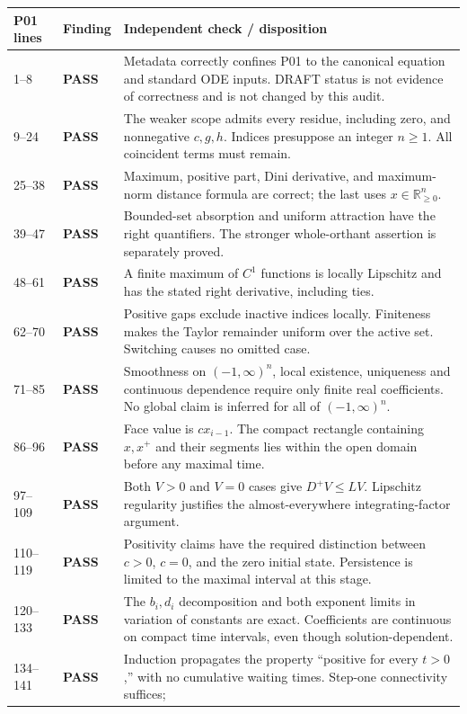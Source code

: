 \documentclass[11pt]{article}
\newcommand{\RR}{\mathbb R}
\newcommand{\Orth}{\RR_{\geq0}^{n}}
\newcommand{\Dom}{(-1,\infty)^n}
\newcommand{\pass}{\textbf{PASS}}
\begin{document}
\small
\begin{longtable}{@{}P{0.12\textwidth}P{0.12\textwidth}P{0.71\textwidth}@{}}
\toprule
P01 lines & Finding & Independent check / disposition \\
\midrule{}--8 & \pass & Metadata correctly confines P01 to the canonical equation
and standard ODE inputs. DRAFT status is not evidence of correctness and
is not changed by this audit. \\
9--24 & \pass & The weaker scope admits every residue, including zero,
and nonnegative $c,g,h$. Indices presuppose an integer $n\geq1$.
All coincident terms must remain. \\
25--38 & \pass & Maximum, positive part, Dini derivative, and maximum-norm
distance formula are correct; the last uses $x\in\Orth$. \\
39--47 & \pass & Bounded-set absorption and uniform attraction have the
right quantifiers. The stronger whole-orthant assertion is separately proved. \\
48--61 & \pass & A finite maximum of $C^1$ functions is locally Lipschitz
and has the stated right derivative, including ties. \\
62--70 & \pass & Positive gaps exclude inactive indices locally. Finiteness
makes the Taylor remainder uniform over the active set. Switching causes
no omitted case. \\
71--85 & \pass & Smoothness on $\Dom$, local existence, uniqueness and
continuous dependence require only finite real coefficients. No global
claim is inferred for all of $\Dom$. \\
86--96 & \pass & Face value is $c x_{i-1}$. The compact rectangle containing
$x,x^+$ and their segments lies within the open domain before any maximal time. \\
97--109 & \pass & Both $V>0$ and $V=0$ cases give $D^+V\leq LV$.
Lipschitz regularity justifies the almost-everywhere integrating-factor argument. \\
110--119 & \pass & Positivity claims have the required distinction between
$c>0$, $c=0$, and the zero initial state. Persistence is limited to the
maximal interval at this stage. \\
120--133 & \pass & The $b_i,d_i$ decomposition and both exponent limits in
variation of constants are exact. Coefficients are continuous on compact
time intervals, even though solution-dependent. \\
134--141 & \pass & Induction propagates the property ``positive for every
$t>0$,'' with no cumulative waiting times. Step-one connectivity suffices;

\end{longtable}
\end{document}
